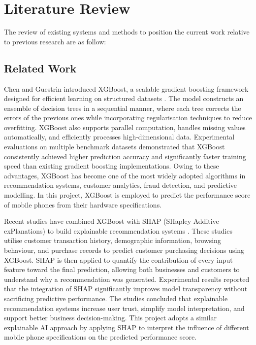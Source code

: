 \documentclass[12pt]{report}
\numberwithin{figure}{chapter}
\numberwithin{table}{chapter}
\numberwithin{equation}{chapter}
\begin{document}
\chapter{Literature Review}
The review of existing systems and methods to position the current work relative to previous research are as follow:

\section{Related Work}
Chen and Guestrin introduced XGBoost, a scalable gradient boosting framework designed for efficient learning on structured datasets \cite{chen}. The model constructs an ensemble of decision trees in a sequential manner, where each tree corrects the errors of the previous ones while incorporating regularisation techniques to reduce overfitting. XGBoost also supports parallel computation, handles missing values automatically, and efficiently processes high-dimensional data. Experimental evaluations on multiple benchmark datasets demonstrated that XGBoost consistently achieved higher prediction accuracy and significantly faster training speed than existing gradient boosting implementations. Owing to these advantages, XGBoost has become one of the most widely adopted algorithms in recommendation systems, customer analytics, fraud detection, and predictive modelling. In this project, XGBoost is employed to predict the performance score of mobile phones from their hardware specifications.

Recent studies have combined XGBoost with SHAP (SHapley Additive exPlanations) to build explainable recommendation systems \cite{crosssell}. These studies utilise customer transaction history, demographic information, browsing behaviour, and purchase records to predict customer purchasing decisions using XGBoost. SHAP is then applied to quantify the contribution of every input feature toward the final prediction, allowing both businesses and customers to understand why a recommendation was generated. Experimental results reported that the integration of SHAP significantly improves model transparency without sacrificing predictive performance. The studies concluded that explainable recommendation systems increase user trust, simplify model interpretation, and support better business decision-making. This project adopts a similar explainable AI approach by applying SHAP to interpret the influence of different mobile phone specifications on the predicted performance score.
\end{document}
